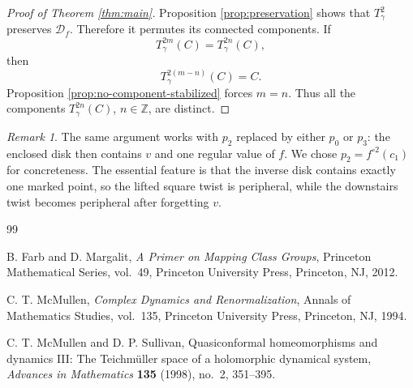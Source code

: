\documentclass[11pt]{article}
\newcommand{\D}{\mathcal D}
\theoremstyle{remark}
\newtheorem{remark}[theorem]{Remark}
\begin{document}
\begin{proof}[Proof of Theorem \ref{thm:main}]
Proposition \ref{prop:preservation} shows that \(T_\gamma^2\)
preserves \(\D_f\).  Therefore it permutes its connected components.
If
\[
T_\gamma^{2m}(C)=T_\gamma^{2n}(C),
\]
then
\[
T_\gamma^{2(m-n)}(C)=C.
\]
Proposition \ref{prop:no-component-stabilized} forces \(m=n\).
Thus all the components \(T_\gamma^{2n}(C)\), \(n\in\mathbb Z\),
are distinct.
\end{proof}

\begin{remark}
The same argument works with \(p_2\) replaced by either \(p_0\) or
\(p_3\): the enclosed disk then contains \(v\) and one regular value
of \(f\).  We chose \(p_2=f^{\circ2}(c_1)\) for concreteness.  The
essential feature is that the inverse disk contains exactly one
marked point, so the lifted square twist is peripheral, while the
downstairs twist becomes peripheral after forgetting \(v\).
\end{remark}

\begin{thebibliography}{99}

B. Farb and D. Margalit,
\emph{A Primer on Mapping Class Groups},
Princeton Mathematical Series, vol.~49,
Princeton University Press, Princeton, NJ, 2012.

C. T. McMullen,
\emph{Complex Dynamics and Renormalization},
Annals of Mathematics Studies, vol.~135,
Princeton University Press, Princeton, NJ, 1994.

C. T. McMullen and D. P. Sullivan,
Quasiconformal homeomorphisms and dynamics III:
The Teichm\"uller space of a holomorphic dynamical system,
\emph{Advances in Mathematics} \textbf{135} (1998), no.~2,
351--395.

\end{thebibliography}
\end{document}
